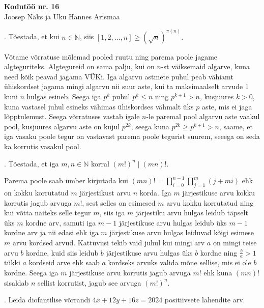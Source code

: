 \documentclass[a4paper, 10pt]{article}
\newcommand{\N}{\mathbb{N}}
\begin{document}
\begin{center}
\Large\textbf{Kodutöö nr. 16}\\
\small{Joosep Näks ja Uku Hannes Arismaa}
\end{center}


\bigskip

. Tõestada, et kui $n\in\N$, siis $[1,2,\ldots,n]\geq\left(\sqrt{n}\right)^{\pi(n)}.$

\bigskip
Võtame võrratuse mõlemad pooled ruutu ning parema poole jagame algteguriteks. Algtegureid on sama palju, kui on $n$-st väiksemaid algarve, kuna need kõik peavad jagama VÜKi. Iga algarvu astmete puhul peab vähiamt ühiskordset jagama mingi algarvu nii suur aste, kui ta maksimaalselt arvude 1 kuni $n$ hulgas esineb. Seega iga $p^k$ puhul $p^k\leq n$ ning $p^{k+1}>n$, kusjuures $k>0$, kuna vastasel juhul esineks vähimas ühiskordses vähmalt üks $p$ aste, mis ei jaga lõpptulemust. Seega võrratuses vastab igale $n$-le paremal pool algarvu aste vaakul pool, kusjuures algarvu aste on kujul $p^{2k}$, seega kuna $p^{2k}\geq p^{k+1}>n$, saame, et iga vasaku poole tegur on vastavast parema poole tegurist suurem, seeega on seda ka korrutis vasakul pool.

\bigskip

. Tõestada, et iga $m,n\in\N$ korral $(m!)^n\mid (mn)!$. 

\bigskip
Parema poole saab ümber kirjutada kui $(mn)!=\prod_{i=0}^{n-1}\prod_{j=1}^{m}(j+mi)$ ehk on kokku korrutatud $m$ järjestikust arvu $n$ korda. Iga $m$ järjestikuse arvu kokku korrutis jagub arvuga $m!$, sest selles on esimesed $m$ arvu kokku korrutatud ning kui võtta näiteks selle tegur $m$, siis iga $m$ järjestiku arvu hulgas leidub täpselt üks $m$ kordne arv, samuti iga $m-1$ järjestikuse arvu hulgas leidub üks $m-1$ kordne arv ja nii edasi ehk iga $m$ järjestikuse arvu hulgas leiduvad kõigi esimese $m$ arvu kordsed arvud. Kattuvusi tekib vaid juhul kui mingi arv $a$ on mingi teise arvu $b$ kordne, kuid siis leidub $b$ järjestikuse arvu hulgas üks $b$ kordne ning $\frac ba>1$ tükki $a$ kordseid arve ehk saab $a$ kordseks arvuks valida mõne sellise, mis ei ole $b$ kordne. Seega iga $m$ järjestikuse arvu korrutis jagub arvuga $m!$ ehk kuna $(mn)!$ sisaldab $n$ sellist korrutist, jagub see arvuga $(m!)^n$.
\bigskip

. Leida diofantilise võrrandi $4x+12y+16z = 2024$ positiivsete lahendite arv. 
\end{document}
